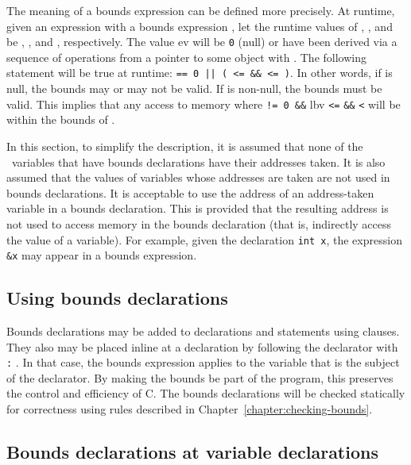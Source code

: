 The meaning of a bounds expression can be defined more precisely. At
runtime, given an expression  with a bounds expression
, let the runtime
values of , , and  be , ,
and , respectively. The value ev will be \texttt{0} (null) or
have been derived via a sequence of operations from a pointer to some
object  with .
The following statement will be true at runtime:
 \texttt{== 0 || ( <= \&\& 
 <= )}. In other words, 
if  is null, the bounds
may or may not be valid. If  is non-null, the bounds must be
valid. This implies that any access to memory where  \texttt{!=
0 \&\&} lbv \texttt{<=}  \texttt{\&\&} 
\texttt{<}  will be within the bounds of .

In this section, to simplify the description, it is assumed that none of
the \arrayptr\ variables that have bounds declarations have
their addresses taken. It is also assumed that the values of variables
whose addresses are taken are not used in bounds declarations. It is
acceptable to use the address of an address-taken variable in a bounds
declaration. This is provided that the resulting address is not used to
access memory in the bounds declaration (that is, indirectly access the
value of a variable). For example, given the declaration \texttt{int x},
the expression \texttt{\&x} may appear in a bounds expression.  

\subsection{Using bounds declarations}

Bounds declarations may be added to declarations and statements using
 clauses. They also may be placed inline at a declaration
by following the declarator with \texttt{:} . In that
case, the bounds expression applies to the variable that is the subject
of the declarator. By making the bounds be part of the program, this
preserves the control and efficiency of C. The bounds declarations will
be checked statically for correctness using rules described in 
Chapter~\ref{chapter:checking-bounds}.

\subsection{Bounds declarations at variable declarations}
\label{section:variable-declarations}

